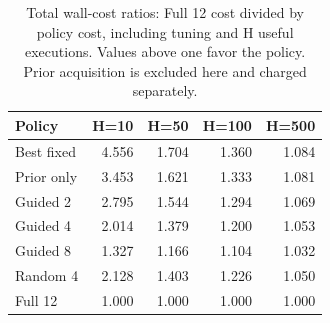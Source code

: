 \begin{table}[t]
\centering\small
\caption{Total wall-cost ratios: Full 12 cost divided by policy cost, including tuning and H useful executions. Values above one favor the policy. Prior acquisition is excluded here and charged separately.}
\label{tab:deployment}
\begin{tabular}{lrrrr}
\hline
Policy & H=10 & H=50 & H=100 & H=500\\
\hline
Best fixed & 4.556 & 1.704 & 1.360 & 1.084 \\
Prior only & 3.453 & 1.621 & 1.333 & 1.081 \\
Guided 2 & 2.795 & 1.544 & 1.294 & 1.069 \\
Guided 4 & 2.014 & 1.379 & 1.200 & 1.053 \\
Guided 8 & 1.327 & 1.166 & 1.104 & 1.032 \\
Random 4 & 2.128 & 1.403 & 1.226 & 1.050 \\
Full 12 & 1.000 & 1.000 & 1.000 & 1.000 \\
\hline
\end{tabular}
\end{table}
